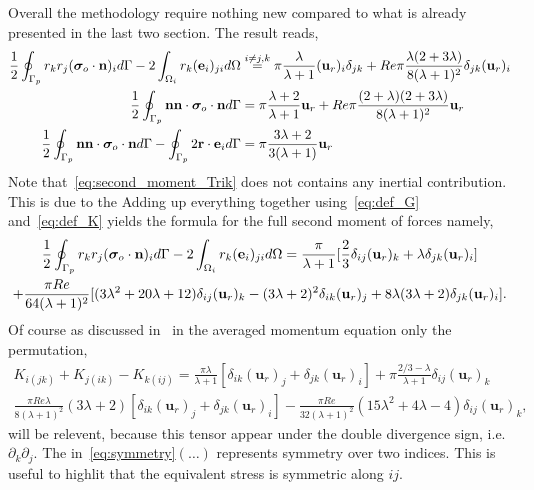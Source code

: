 Overall the methodology require nothing new compared to what is already presented in the last two section. 
The result reads, 
\begin{align}
    \frac{1}{2}\intS[p]{r_kr_j ( \bm\sigma_{o}\cdot \textbf{n})_i}
    - 2\intO[i]{r_k (\textbf{e}_i)_{ji}}
    &\overset{i\neq j,k}{=}
    \pi \frac{\lambda}{\lambda+1}(\textbf{u}_r)_i \delta_{jk} 
    + Re  \pi \frac{\lambda (2+3\lambda)}{8(\lambda+1)^2} \delta_{jk} (\textbf{u}_r)_i\\
    \frac{1}{2}\intS[p]{\textbf{nn} \cdot  \bm\sigma_{o}\cdot \textbf{n}}
    &=
    \pi\frac{\lambda+2}{\lambda+1}\textbf{u}_r
    + Re \pi \frac{(2+\lambda)(2+3\lambda)}{8(\lambda+1)^2}\textbf{u}_r   \\
    \frac{1}{2}\intS[p]{\textbf{nn} \cdot  \bm\sigma_{o}\cdot \textbf{n}}
    - \intS[p]{2 \textbf{r}\cdot \textbf{e}_i}
    &=
    \pi \frac{3\lambda +2}{3(\lambda+1)} \textbf{u}_{r}
    \label{eq:second_moment_Trik}
\end{align}
Note that~\ref{eq:second_moment_Trik} does not contains any inertial contribution. 
This is due to the 
Adding up everything together using~\ref{eq:def_G} and~\ref{eq:def_K} yields the formula for the full second moment of forces namely,  
\begin{multline}
    \frac{1}{2}\intS[p]{r_kr_j ( \bm\sigma_{o}\cdot \textbf{n})_i}
    - 2\intO[i]{r_k (\textbf{e}_i)_{ji}}
    =
    \frac{\pi }{\lambda+1} [
        \frac{2}{3}\delta_{ij} (\textbf{u}_r)_k 
        + \lambda \delta_{jk} (\textbf{u}_r)_i
    ]\\ 
    +
    \frac{\pi Re}{64(\lambda+1)^2} [
        (3\lambda^2+20\lambda +12) \delta_{ij} (\textbf{u}_r)_k 
        -( 3\lambda+2)^2 \delta_{ik} (\textbf{u}_r)_j 
        + 8 \lambda (3\lambda+2)\delta_{jk} (\textbf{u}_r)_i
    ]. 
    \label{eq:second_mom_final}
\end{multline}
Of course as discussed in~\cite[Eq. (5.35)]{fintzi2024averaged} in the averaged momentum equation only the permutation, 
\begin{multline}
    K_{i(jk)}
    + K_{j(ik)}
    - K_{k(ij)}
    =
    \frac{\pi \lambda}{\lambda+1} [\delta_{ik} (\textbf{u}_r)_j + \delta_{jk} (\textbf{u}_r)_i]
    + 
    \pi \frac{ 2/3 - \lambda}{\lambda+1}  \delta_{ij} (\textbf{u}_r)_k\\
    \frac{\pi Re \lambda}{8(\lambda+1)^2} ( 3\lambda+2) [\delta_{ik} (\textbf{u}_r)_j + \delta_{jk} (\textbf{u}_r)_i]
    - 
    \frac{\pi Re}{32(\lambda+1)^2} ( 15\lambda^2+4\lambda -4) \delta_{ij} (\textbf{u}_r)_k,
    \label{eq:symmetry}
\end{multline}
will be relevent, because this tensor appear under the double divergence sign, i.e. $\partial_k \partial_j$.
The in~\ref{eq:symmetry}$(\ldots)$ represents symmetry over two indices. 
This is useful to highlit that the equivalent stress is symmetric along $ij$. 
